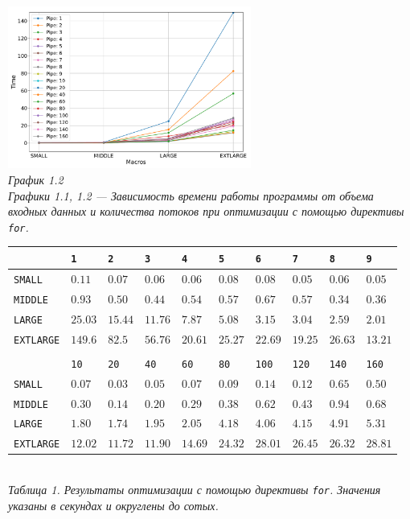 \documentclass[a4paper, 11pt]{article}
\begin{document}
\begin{center}
    \includegraphics[width=0.6\textwidth]{../graph/for1.pdf} \\
    \small \it
    График 1.2\\ Графики 1.1, 1.2 --- Зависимость времени работы программы от объема входных данных и количества потоков при оптимизации с помощью директивы \texttt{for}.
\end{center}

\begin{center}
    \begin{tabular}{l | l l l l l l l l l}
        & \texttt{1} & \texttt{2} & \texttt{3} & \texttt{4} & \texttt{5} & \texttt{6} & \texttt{7} & \texttt{8} & \texttt{9} \\
        \hline
        \texttt{SMALL}    & $0.11$ & $0.07$ & $0.06$ & $0.06$ & $0.08$ & $0.08$ & $0.05$ & $0.06$ & $0.05$ \\
        \texttt{MIDDLE}   & $0.93$ & $0.50$ & $0.44$ & $0.54$ & $0.57$ & $0.67$ & $0.57$ & $0.34$ & $0.36$ \\
        \texttt{LARGE}    & $25.03$ & $15.44$ & $11.76$ & $7.87$ & $5.08$ & $3.15$ & $3.04$ & $2.59$ & $2.01$ \\
        \texttt{EXTLARGE} & $149.6$ & $82.5$ & $56.76$ & $20.61$ & $25.27$ & $22.69$ & $19.25$ & $26.63$ & $13.21$ \\
        \vspace{0.4cm}\\
        & \texttt{10} & \texttt{20} & \texttt{40} & \texttt{60} & \texttt{80} & \texttt{100} & \texttt{120} & \texttt{140} & \texttt{160} \\
        \hline
        \texttt{SMALL}    & $0.07$ & $0.03$ & $0.05$ & $0.07$ & $0.09$ & $0.14$ & $0.12$ & $0.65$ & $0.50$ \\
        \texttt{MIDDLE}   & $0.30$ & $0.14$ & $0.20$ & $0.29$ & $0.38$ & $0.62$ & $0.43$ & $0.94$ & $0.68$ \\
        \texttt{LARGE}    & $1.80$ & $1.74$ & $1.95$ & $2.05$ & $4.18$ & $4.06$ & $4.15$ & $4.91$ & $5.31$ \\
        \texttt{EXTLARGE} & $12.02$ & $11.72$ & $11.90$ & $14.69$ & $24.32$ & $28.01$ & $26.45$ & $26.32$ & $28.81$ \\
    \end{tabular}\\
    \vspace{0.3cm}
    \small \it
    Таблица 1. Результаты оптимизации с помощью директивы \texttt{for}. Значения указаны в секундах и округлены до сотых.
\end{center}
\newpage
\end{document}
